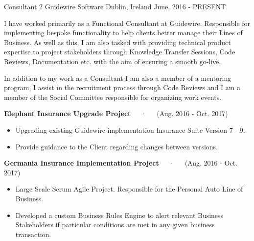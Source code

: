 

\begin{cventries}
   \cventry
    {Consultant 2} %
    {Guidewire Software} %
    {Dublin, Ireland} %
    {June. 2016 - PRESENT} %
    {
    \begin{cvitems} %
    	\item {I have worked primarily as a Functional Consultant at Guidewire. Responsible for implementing  bespoke functionality to help clients better manage their Lines of Business. As well as this, I am also tasked with providing technical product expertise to project stakeholders through Knowledge Transfer Sessions, Code Reviews, Documentation etc. with the aim of ensuring a smooth go-live. }
    	\item {In addition to my work as a Consultant I am also a member of a mentoring program, I assist in the recruitment process through Code Reviews and I am a member of the Social Committee responsible for organizing work events.
{\\}    	
}
        \item {\textbf{Elephant Insurance Upgrade Project}~~~·~~~(Aug. 2016 - Oct. 2017)
		\begin{itemize}
			\item Upgrading existing Guidewire implementation 							Insurance Suite Version 7 - 9. 
			\item Provide guidance to the Client regarding changes 						between versions. {~\\}
		\end{itemize}
}
    \item {\textbf{Germania Insurance Implementation Project}~~~·~~~(Aug. 2016 - Oct. 2017)
		\begin{itemize}
  		\item Large Scale Scrum Agile Project. Responsible for the 						Personal Auto Line of Business.
  		\item Developed a custom Business Rules Engine to alert 						relevant Business Stakeholders if particular 							conditions are met in any given business transaction.

\end{itemize}}
\end{cvitems}}
\end{cventries}
